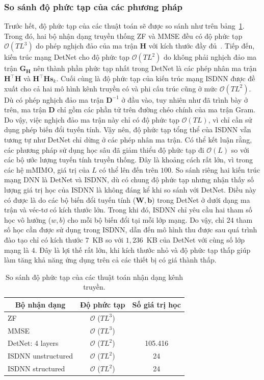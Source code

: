 \subsubsection{So sánh độ phức tạp của các phương pháp}
Trước hết, độ phức tạp của các thuật toán sẽ được so sánh như trên bảng~\ref{tab:computational}. Trong đó, hai bộ nhận dạng truyền thống ZF và MMSE đều có độ phức tạp $\mathcal{O}(TL^3)$ do phép nghịch đảo của ma trận $\mathbf{H}$ với kích thước đầy đủ~\cite{Victor1992}. Tiếp đến, kiến trúc mạng DetNet cho độ phức tạp $\mathcal{O}(TL^2)$ do không phải nghịch đảo ma trận $\mathbf{G}_\mathbf{H}$ nên thành phần phức tạp nhất trong DetNet là các phép nhân ma trận $\mathbf{H}^\top \mathbf{H}$ và $\mathbf{H}^\top \mathbf{H} \mathbf{s}_k$. Cuối cùng là độ phức tạp của kiến trúc mạng ISDNN được đề xuất cho cả hai mô hình kênh truyền có và phi cấu trúc cũng ở mức $\mathcal{O}(TL^2)$. Dù có phép nghịch đảo ma trận $\mathbf{D}^{-1}$ ở đầu vào, tuy nhiên như đã trình bày ở trên, ma trận $\mathbf{D}$ chỉ gồm các phần tử trên đường chéo chính của ma trận Gram. Do vậy, việc nghịch đảo ma trận này chỉ có độ phức tạp $\mathcal{O}(TL)$, vì chỉ cần sử dụng phép biến đổi tuyến tính. Vậy nên, độ phức tạp tổng thể của ISDNN vẫn tương tự như DetNet chỉ dừng ở các phép nhân ma trận. Có thể kết luận rằng, các phương pháp sử dụng học sâu đã giảm thiểu độ phức tạp đi $\mathcal{O}(L)$ so với các bộ ước lượng tuyến tính truyền thống. Đây là khoảng cách rất lớn, vì trong các hệ mMIMO, giá trị của $L$ có thể lên đến trên $100$. So sánh riêng hai kiến trúc mạng DNN là DetNet và ISDNN, dù có chung độ phức tạp nhưng nhận thấy số lượng giá trị học của ISDNN là không đáng kể khi so sánh với DetNet. Điều này có được là do các bộ biến đổi tuyến tính ($\mathbf{W}, \mathbf{b}$) trong DetNet ở dưới dạng ma trận và véc-tơ có kích thước lớn. Trong khi đó, ISDNN chỉ yêu cầu hai tham số học vô hướng ($w, b$) cho mỗi bộ biến đổi tại mỗi lớp mạng. Do vậy, chỉ $24$ tham số học cần được sử dụng trong ISDNN, dẫn đến mô hình thu được sau quá trình đào tạo chỉ có kích thước $7$~KB so với $1,236$~KB của DetNet với cùng số lớp mạng là $4$. Đây là lợi thế rất lớn, khi kích thước nhỏ và độ phức tạp thấp giúp làm tăng khả năng ứng dụng trên cả các thiết bị có giá thành thấp.
\begin{table}[t]
    \centering
    \caption{So sánh độ phức tạp của các thuật toán nhận dạng kênh truyền.}
    \label{tab:computational}
    \begin{tabular}{l|c|c}
    \hline
    \hline
    \multicolumn{1}{c|}{\textbf{Bộ nhận dạng}} & \textbf{Độ phức tạp} & \textbf{Số giá trị học} \\ \hline
    ZF & $\mathcal{O}$ ($TL^3$) &  \\ \hline
    MMSE & $\mathcal{O}$ ($TL^3$) &  \\ \hline
    DetNet: 4 layers~\cite{Samuel2019} & $\mathcal{O}$ ($TL^2$) & 105.416 \\ \hline
    ISDNN unstructured& $\mathcal{O}$ ($TL^2$) & 24 \\ \hline
    ISDNN structured& $\mathcal{O}$ ($TL^2$) & 24 \\ \hline
    \end{tabular}
\end{table}

